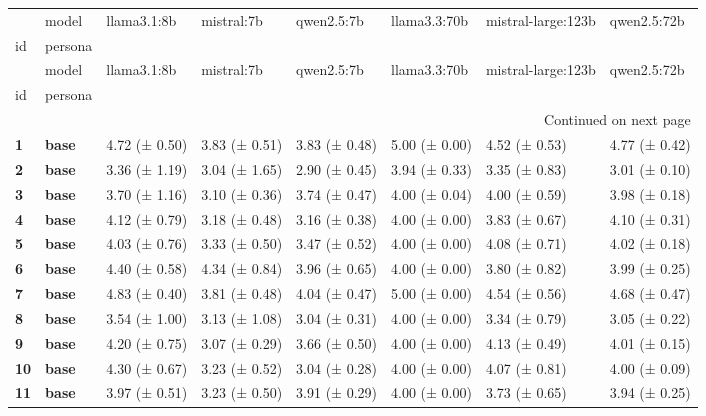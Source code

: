 \begin{longtable}{llllllll}
\toprule
 & model & llama3.1:8b & mistral:7b & qwen2.5:7b & llama3.3:70b & mistral-large:123b & qwen2.5:72b \\
id & persona &  &  &  &  &  &  \\
\midrule
\endfirsthead
\toprule
 & model & llama3.1:8b & mistral:7b & qwen2.5:7b & llama3.3:70b & mistral-large:123b & qwen2.5:72b \\
id & persona &  &  &  &  &  &  \\
\midrule
\endhead
\midrule
\multicolumn{8}{r}{Continued on next page} \\
\midrule
\endfoot
\bottomrule
\endlastfoot
\textbf{1} & \textbf{base} & 4.72 (± 0.50) & 3.83 (± 0.51) & 3.83 (± 0.48) & 5.00 (± 0.00) & 4.52 (± 0.53) & 4.77 (± 0.42) \\
\cline{1-8}
\textbf{2} & \textbf{base} & 3.36 (± 1.19) & 3.04 (± 1.65) & 2.90 (± 0.45) & 3.94 (± 0.33) & 3.35 (± 0.83) & 3.01 (± 0.10) \\
\cline{1-8}
\textbf{3} & \textbf{base} & 3.70 (± 1.16) & 3.10 (± 0.36) & 3.74 (± 0.47) & 4.00 (± 0.04) & 4.00 (± 0.59) & 3.98 (± 0.18) \\
\cline{1-8}
\textbf{4} & \textbf{base} & 4.12 (± 0.79) & 3.18 (± 0.48) & 3.16 (± 0.38) & 4.00 (± 0.00) & 3.83 (± 0.67) & 4.10 (± 0.31) \\
\cline{1-8}
\textbf{5} & \textbf{base} & 4.03 (± 0.76) & 3.33 (± 0.50) & 3.47 (± 0.52) & 4.00 (± 0.00) & 4.08 (± 0.71) & 4.02 (± 0.18) \\
\cline{1-8}
\textbf{6} & \textbf{base} & 4.40 (± 0.58) & 4.34 (± 0.84) & 3.96 (± 0.65) & 4.00 (± 0.00) & 3.80 (± 0.82) & 3.99 (± 0.25) \\
\cline{1-8}
\textbf{7} & \textbf{base} & 4.83 (± 0.40) & 3.81 (± 0.48) & 4.04 (± 0.47) & 5.00 (± 0.00) & 4.54 (± 0.56) & 4.68 (± 0.47) \\
\cline{1-8}
\textbf{8} & \textbf{base} & 3.54 (± 1.00) & 3.13 (± 1.08) & 3.04 (± 0.31) & 4.00 (± 0.00) & 3.34 (± 0.79) & 3.05 (± 0.22) \\
\cline{1-8}
\textbf{9} & \textbf{base} & 4.20 (± 0.75) & 3.07 (± 0.29) & 3.66 (± 0.50) & 4.00 (± 0.00) & 4.13 (± 0.49) & 4.01 (± 0.15) \\
\cline{1-8}
\textbf{10} & \textbf{base} & 4.30 (± 0.67) & 3.23 (± 0.52) & 3.04 (± 0.28) & 4.00 (± 0.00) & 4.07 (± 0.81) & 4.00 (± 0.09) \\
\cline{1-8}
\textbf{11} & \textbf{base} & 3.97 (± 0.51) & 3.23 (± 0.50) & 3.91 (± 0.29) & 4.00 (± 0.00) & 3.73 (± 0.65) & 3.94 (± 0.25) \\

\end{longtable}

